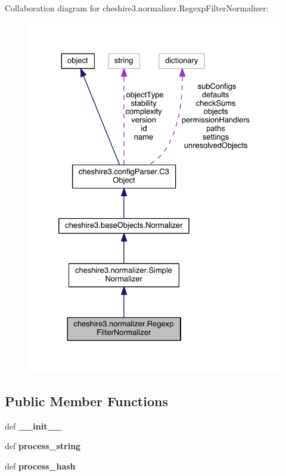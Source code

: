 Collaboration diagram for cheshire3.\-normalizer.\-Regexp\-Filter\-Normalizer\-:
\nopagebreak
\begin{figure}[H]
\begin{center}
\leavevmode
\includegraphics[width=328pt]{classcheshire3_1_1normalizer_1_1_regexp_filter_normalizer__coll__graph}
\end{center}
\end{figure}
\subsection*{Public Member Functions}
\begin{DoxyCompactItemize}
\item 
\hypertarget{classcheshire3_1_1normalizer_1_1_regexp_filter_normalizer_a162f1126a1e498a2b6ba4d011014d427}{def {\bfseries \-\_\-\-\_\-init\-\_\-\-\_\-}}\label{classcheshire3_1_1normalizer_1_1_regexp_filter_normalizer_a162f1126a1e498a2b6ba4d011014d427}

\item 
\hypertarget{classcheshire3_1_1normalizer_1_1_regexp_filter_normalizer_a973bfb9e94094c7feb6026fd14fe057a}{def {\bfseries process\-\_\-string}}\label{classcheshire3_1_1normalizer_1_1_regexp_filter_normalizer_a973bfb9e94094c7feb6026fd14fe057a}

\item 
\hypertarget{classcheshire3_1_1normalizer_1_1_regexp_filter_normalizer_a2cd1ac1992c21f4190907301af2d6d7e}{def {\bfseries process\-\_\-hash}}\label{classcheshire3_1_1normalizer_1_1_regexp_filter_normalizer_a2cd1ac1992c21f4190907301af2d6d7e}

\end{DoxyCompactItemize}
